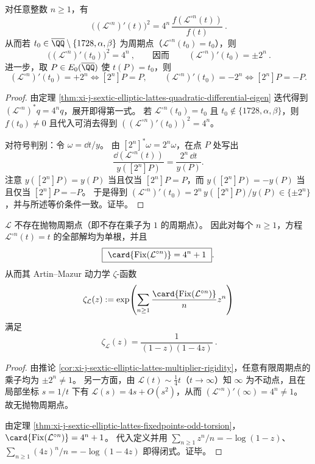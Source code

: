 \begin{corollary}[迭代导数的望远镜恒等式与周期乘子刚性]\label{cor:xi-j-sextic-elliptic-lattes-multiplier-rigidity}
对任意整数 \(n\ge 1\)，有
\[
\boxed{\ \bigl((\mathcal L^{\circ n})'(t)\bigr)^2
=4^n\,\frac{f(\mathcal L^{\circ n}(t))}{f(t)}\ }.
\]
从而若 \(t_0\in\overline{\QQ}\setminus\{1728,\alpha,\beta\}\) 为周期点（\(\mathcal L^{\circ n}(t_0)=t_0\)），则
\[
\boxed{\ \bigl((\mathcal L^{\circ n})'(t_0)\bigr)^2=4^n\ },
\qquad\text{因而}\qquad
\boxed{\ (\mathcal L^{\circ n})'(t_0)=\pm 2^n\ }.
\]
进一步，取 \(P\in E_0(\overline{\QQ})\) 使 \(t(P)=t_0\)，则
\[
(\mathcal L^{\circ n})'(t_0)=+2^n\iff [2^n]P=P,
\qquad
(\mathcal L^{\circ n})'(t_0)=-2^n\iff [2^n]P=-P.
\]
\end{corollary}
\begin{proof}
由定理 \ref{thm:xi-j-sextic-elliptic-lattes-quadratic-differential-eigen} 迭代得到 \((\mathcal L^{\circ n})^\ast q=4^n q\)，展开即得第一式。
若 \(\mathcal L^{\circ n}(t_0)=t_0\) 且 \(t_0\notin\{1728,\alpha,\beta\}\)，则 \(f(t_0)\neq 0\) 且代入可消去得到 \(((\mathcal L^{\circ n})'(t_0))^2=4^n\)。
\par
对符号判别：令 \(\omega=\dd t/y\)。
由 \([2^n]^\ast\omega=2^n\omega\)，在点 \(P\) 处写出
\[
\frac{\dd(\mathcal L^{\circ n}(t))}{y([2^n]P)}=\frac{2^n\,\dd t}{y(P)}.
\]
注意 \(y([2^n]P)=y(P)\) 当且仅当 \([2^n]P=P\)，而 \(y([2^n]P)=-y(P)\) 当且仅当 \([2^n]P=-P\)。
于是得到 \((\mathcal L^{\circ n})'(t_0)=2^n\,y([2^n]P)/y(P)\in\{\pm 2^n\}\)，并与所述等价条件一致。证毕。
\end{proof}


\begin{corollary}\label{cor:xi-j-sextic-elliptic-lattes-artin-mazur-zeta}
\(\mathcal L\) 不存在抛物周期点（即不存在乘子为 \(1\) 的周期点）。
因此对每个 \(n\ge 1\)，方程 \(\mathcal L^{\circ n}(t)=t\) 的全部解均为单根，并且
\[
\boxed{\ \card{\mathrm{Fix}(\mathcal L^{\circ n})}=4^n+1\ }.
\]
从而其 Artin--Mazur 动力学 \(\zeta\)-函数
\[
\zeta_{\mathcal L}(z):=\exp\!\left(\sum_{n\ge 1}\frac{\card{\mathrm{Fix}(\mathcal L^{\circ n})}}{n}z^n\right)
\]
满足
\[
\boxed{\ \zeta_{\mathcal L}(z)=\frac{1}{(1-z)(1-4z)}\ }.
\]
\end{corollary}
\begin{proof}
由推论 \ref{cor:xi-j-sextic-elliptic-lattes-multiplier-rigidity}，任意有限周期点的乘子均为 \(\pm 2^n\neq 1\)。
另一方面，由 \(\mathcal L(t)\sim \tfrac14 t\)（\(t\to\infty\)）知 \(\infty\) 为不动点，且在局部坐标 \(s=1/t\) 下有 \(\mathcal L(s)=4s+O(s^2)\)，从而 \((\mathcal L^{\circ n})'(\infty)=4^n\neq 1\)。
故无抛物周期点。
\par
由定理 \ref{thm:xi-j-sextic-elliptic-lattes-fixedpoints-odd-torsion}，
\(\card{\mathrm{Fix}(\mathcal L^{\circ n})}=4^n+1\)。
代入定义并用 \(\sum_{n\ge1}z^n/n=-\log(1-z)\)、\(\sum_{n\ge1}(4z)^n/n=-\log(1-4z)\) 即得闭式。证毕。
\end{proof}

